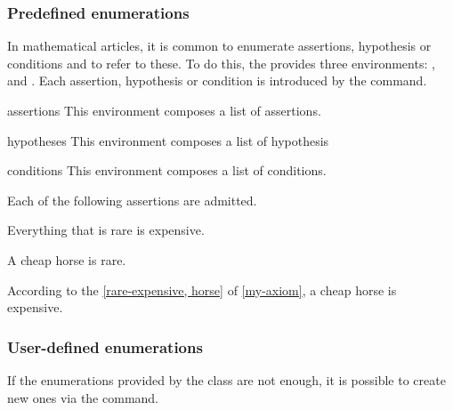 \documentclass[english,nolocaltoc]{nwejmart}
\newtheorem[style=definition]{fact}
\newtheorem[title=experience]{experience}
\newtheorem[title-plural=rings]{ring}
\newtheorem[title=ideal,title-plural=ideals]{ideal}
\begin{document}
\subsubsection{Predefined enumerations}
\label{sec:predefinies-:-listes}

In mathematical articles, it is common to enumerate assertions,
hypothesis or conditions and to refer to these. To do this, the
\nwejmauthorcl{} provides three environments: ,
 and . Each assertion,
hypothesis or condition is introduced by the  command.

\begin{docEnvironment}[doclang/environment content=assertions]{assertions}{}
  This environment composes a list of assertions.
\end{docEnvironment}
\begin{docEnvironment}[doclang/environment content=hypothesis]{hypotheses}{}
  This environment composes a list of hypothesis
\end{docEnvironment}
\begin{docEnvironment}[doc new=2019-03-18,doclang/environment content=conditions]{conditions}{}
  This environment composes a list of  conditions.
\end{docEnvironment}

\begin{bodycode}[listing and text,listing options={deletekeywords={[2]label}}]
\begin{axiom}\label{my-axiom}
  Each of the following assertions are admitted.
  \begin{assertions}
  \item\label{rare-expensive} Everything that is rare is expensive.
  \item\label{horse}A cheap horse is rare.
  \end{assertions}
\end{axiom}
According to the \vref{rare-expensive, horse} of \vref{my-axiom}, a
cheap horse is expensive.
\end{bodycode}

\subsubsection{User-defined enumerations}

If the enumerations provided by the  class are not enough, it is
possible to create new ones via the  command.
\end{document}
